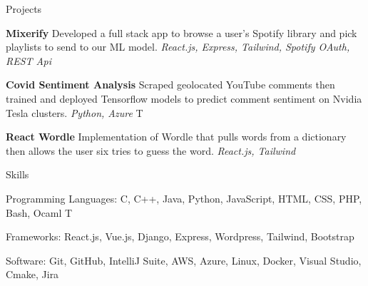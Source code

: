 \documentclass[]{mcdowellcv}
\begin{document}
\begin{cvsection}{Projects}
	\begin{cvsubsection}{}{}{}
		\begin{itemize}
			\setlength\itemsep{3pt}
			\item \textbf{Mixerify} Developed a full stack app to browse a user's Spotify library and pick playlists to send to our ML model. \textit{React.js, Express, Tailwind, Spotify OAuth, REST Api}
			\item \textbf{Covid Sentiment Analysis}  Scraped geolocated YouTube comments then trained and deployed Tensorflow models to predict comment sentiment on Nvidia Tesla clusters. \textit{Python, Azure}
			\ifx\WEB T{
				\item \textbf{React Wordle} Implementation of Wordle that pulls words from a dictionary then allows the user six tries to guess the word. \textit{React.js, Tailwind}
			}\fi
		\end{itemize}
	\end{cvsubsection}
\end{cvsection}
\begin{cvsection}{Skills}
	\begin{cvsubsection}{}{}{}
		\begin{itemize}
			\item Programming Languages:  C, C++, Java, Python, JavaScript, HTML, CSS, PHP, Bash, Ocaml
			\ifx\WEB T{\item Frameworks: React.js, Vue.js, Django, Express, Wordpress, Tailwind, Bootstrap}\fi
			\item Software:  Git, GitHub, IntelliJ Suite, AWS, Azure, Linux, Docker, Visual Studio, Cmake, Jira
		\end{itemize}
	\end{cvsubsection}
\end{cvsection}
\end{document}
